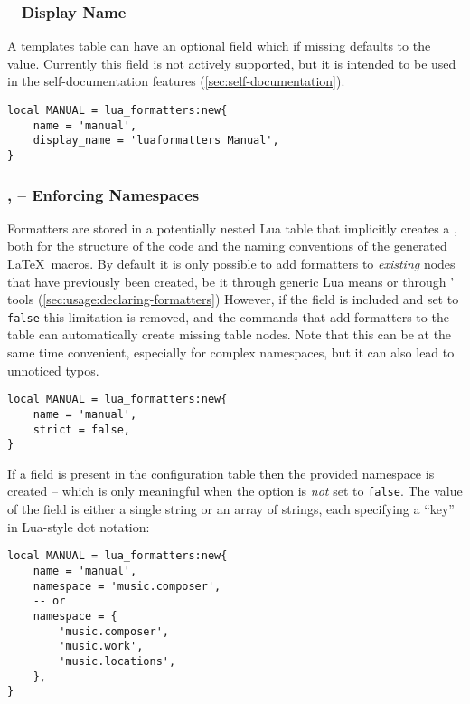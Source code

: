 \documentclass[12pt]{scrartcl}
\begin{document}
\subsubsection[Display Name]{ -- Display Name}

A templates table can have an optional field  which if
missing defaults to the  value.  Currently this field is not
actively supported, but it is intended to be used in the self-documentation
features (\vref{sec:self-documentation}).

\begin{verbatim}
local MANUAL = lua_formatters:new{
	name = 'manual',
	display_name = 'luaformatters Manual',
}
\end{verbatim}

\subsubsection[Enforcing Namespaces]{,  -- Enforcing Namespaces}

Formatters are stored in a potentially nested Lua table that implicitly creates
a , both for the structure of the code and the naming
conventions of the generated \LaTeX\ macros. By default it is only possible to
add formatters to \emph{existing} nodes that have previously been created, be it
through generic Lua means or through \luaformatters' tools
(\vref{sec:usage:declaring-formatters})  However, if the  field
is included and set to \texttt{false} this limitation is removed, and the
commands that add formatters to the table can automatically create missing table
nodes. Note that this can be at the same time convenient, especially for complex
namespaces, but it can also lead to unnoticed typos.

\begin{verbatim}
local MANUAL = lua_formatters:new{
	name = 'manual',
	strict = false,
}
\end{verbatim}

\noindent If a  field is present in the configuration table
then the provided namespace is created -- which is only meaningful when the
 option is \emph{not} set to \texttt{false}.  The value of the
field is either a single string or an array of strings, each specifying a “key”
in Lua-style dot notation:

\begin{verbatim}
local MANUAL = lua_formatters:new{
	name = 'manual',
	namespace = 'music.composer',
	-- or
	namespace = {
		'music.composer',
		'music.work',
		'music.locations',
	},
}
\end{verbatim}
\end{document}
